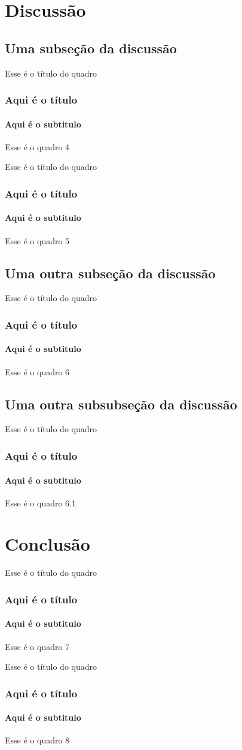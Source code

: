 \documentclass{beamer}
\begin{document}
	\section{Discussão}
	\subsection{Uma subseção da discussão}
	\begin{frame}{Esse é o título do quadro}
		\frametitle{Aqui é o título}
		\framesubtitle{Aqui é o subtitulo}
		Esse é o quadro 4 %
	\end{frame}
	
	\begin{frame}{Esse é o título do quadro}
		\frametitle{Aqui é o título}
		\framesubtitle{Aqui é o subtitulo}
		Esse é o quadro 5
	\end{frame}
	
	\subsection{Uma outra subseção da discussão}
	\begin{frame}{Esse é o título do quadro}
		\frametitle{Aqui é o título}
		\framesubtitle{Aqui é o subtitulo}
		Esse é o quadro 6
	\end{frame}
	
	\subsection{Uma outra subsubseção da discussão}
	\begin{frame}{Esse é o título do quadro}
		\frametitle{Aqui é o título}
		\framesubtitle{Aqui é o subtitulo}
		Esse é o quadro 6.1
	\end{frame}
	
	\section{Conclusão}
	\begin{frame}{Esse é o título do quadro}
		\frametitle{Aqui é o título}
		\framesubtitle{Aqui é o subtitulo}
		Esse é o quadro 7
	\end{frame}
	
	\begin{frame}{Esse é o título do quadro}
		\frametitle{Aqui é o título}
		\framesubtitle{Aqui é o subtitulo}
		Esse é o quadro 8
	\end{frame}
	
	
\end{document}

